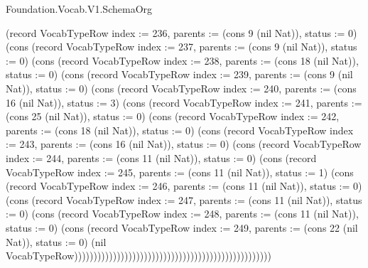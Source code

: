 \begin{lexlean}{Foundation.Vocab.V1.SchemaOrg}
\begin{semanticmodule}
{(record VocabTypeRow {index := 236, parents := (cons 9 (nil Nat)), status := 0}) (cons (record VocabTypeRow {index := 237, parents := (cons 9 (nil Nat)), status := 0}) (cons (record VocabTypeRow {index := 238, parents := (cons 18 (nil Nat)), status := 0}) (cons (record VocabTypeRow {index := 239, parents := (cons 9 (nil Nat)), status := 0}) (cons (record VocabTypeRow {index := 240, parents := (cons 16 (nil Nat)), status := 3}) (cons (record VocabTypeRow {index := 241, parents := (cons 25 (nil Nat)), status := 0}) (cons (record VocabTypeRow {index := 242, parents := (cons 18 (nil Nat)), status := 0}) (cons (record VocabTypeRow {index := 243, parents := (cons 16 (nil Nat)), status := 0}) (cons (record VocabTypeRow {index := 244, parents := (cons 11 (nil Nat)), status := 0}) (cons (record VocabTypeRow {index := 245, parents := (cons 11 (nil Nat)), status := 1}) (cons (record VocabTypeRow {index := 246, parents := (cons 11 (nil Nat)), status := 0}) (cons (record VocabTypeRow {index := 247, parents := (cons 11 (nil Nat)), status := 0}) (cons (record VocabTypeRow {index := 248, parents := (cons 11 (nil Nat)), status := 0}) (cons (record VocabTypeRow {index := 249, parents := (cons 22 (nil Nat)), status := 0}) (nil VocabTypeRow)))))))))))))))))))))))))))))))))))))))))))))))))))
}


\end{semanticmodule}
\end{lexlean}
